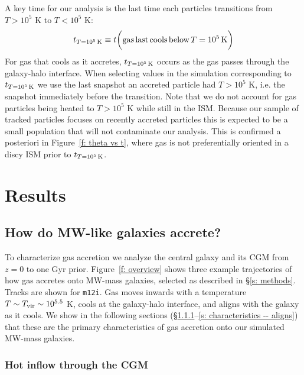 \documentclass[fleqn,usenatbib]{mnras}
\newcommand{\tcon}{t_{T=10^5\,{\rm K}}}
\begin{document}
A key time for our analysis is the last time each particles transitions from $T > 10^5$ K to $T< 10^5$ K:
\begin{equation}
    \tcon \equiv t \bigg( {\rm gas\,last\,cools\,below}\,T=10^5\,{\rm K} \bigg)
\end{equation}
For gas that cools as it accretes, $\tcon$ occurs as the gas passes through the galaxy-halo interface.
When selecting values in the simulation corresponding to $\tcon$ we use the last snapshot an accreted particle had $T > 10^5$ K, i.e. the snapshot immediately before the transition.
Note that we do not account for gas particles being heated to $T > 10^5$ K while still in the ISM.
Because our sample of tracked particles focuses on recently accreted particles this is expected to be a small population that will not contaminate our analysis.
This is confirmed a posteriori in Figure~\ref{f: theta vs t}, where gas is not preferentially oriented in a discy ISM prior to $\tcon$.

\section{Results}
\label{s: results}


\subsection{How do MW-like galaxies accrete?}
\label{s: characteristics}

To characterize gas accretion we analyze the central galaxy and its CGM from $z=0$ to one Gyr prior.
Figure~\ref{f: overview} shows three example trajectories of how gas accretes onto MW-mass galaxies, selected as described in \S\ref{s: methods}.
Tracks are shown for \texttt{m12i}.
Gas moves inwards with a temperature $T \sim T_{\rm vir} \sim 10^{5.5}$ K, cools at the galaxy-halo interface, and aligns with the galaxy as it cools.
We show in the following sections (\S\ref{s: characteristics -- inflowing gas phase}--\ref{s: characteristics -- aligns}) that these are the primary characteristics of gas accretion onto our simulated MW-mass galaxies.

\subsubsection{Hot inflow through the CGM}
\label{s: characteristics -- inflowing gas phase}
\end{document}
